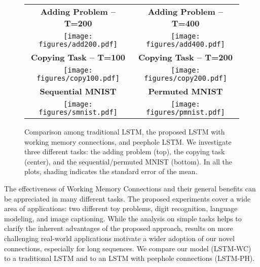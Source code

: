 %
\begin{figure*}[t!]
\setlength{\tabcolsep}{.3em}
\centering
\renewcommand{\arraystretch}{0.5}
\begin{tabular}{cc}
    \scriptsize\textbf{Adding Problem -- T=200} &  \scriptsize\textbf{Adding Problem -- T=400}\\
    \texttt{[image: figures/add200.pdf]}
     &  
     \texttt{[image: figures/add400.pdf]}
     \\
    \scriptsize\textbf{Copying Task -- T=100} & \scriptsize\textbf{Copying Task -- T=200}\\
    \texttt{[image: figures/copy100.pdf]} 
    &
   \texttt{[image: figures/copy200.pdf]}
    \\
    \scriptsize\textbf{Sequential MNIST} & \scriptsize\textbf{Permuted MNIST} \\
    \texttt{[image: figures/smnist.pdf]} 
     &  
    \texttt{[image: figures/pmnist.pdf]}
\end{tabular}
\caption{Comparison among traditional LSTM, the proposed LSTM with working memory connections, and peephole LSTM. We investigate three different tasks: the adding problem (top), the copying task (center), and the sequential/permuted MNIST (bottom). In all the plots, shading indicates the standard error of the mean.}
\label{fig:plots}
\end{figure*}

The effectiveness of Working Memory Connections and their general benefits can be appreciated in many different tasks. The proposed experiments cover a wide area of applications: two different toy problems, digit recognition, language modeling, and image captioning. While the analysis on simple tasks helps to clarify the inherent advantages of the proposed approach, results on more challenging real-world applications motivate a wider adoption of our novel connections, especially for long sequences.
We compare our model (LSTM-WC) to a traditional LSTM and to an LSTM with peephole connections (LSTM-PH).

